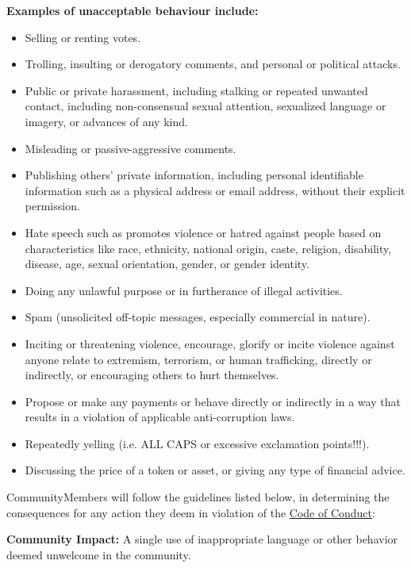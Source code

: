\textbf{Examples of unacceptable behaviour include:}
\begin{itemize}
	\item Selling or renting votes.
	\item Trolling, insulting or derogatory comments, and personal or political attacks.
	\item Public or private harassment, including stalking or repeated unwanted contact, including non-consensual sexual attention, sexualized language or imagery, or advances of any kind.
	\item Misleading or passive-aggressive comments.
	\item Publishing others' private information, including personal identifiable information such as a physical address or email address, without their explicit permission.
	\item Hate speech such as promotes violence or hatred against people based on characteristics like race, ethnicity, national origin, caste, religion, disability, disease, age, sexual orientation, gender, or gender identity.
	\item Doing any unlawful purpose or in furtherance of illegal activities.
	\item Spam (unsolicited off-topic messages, especially commercial in nature).
	\item Inciting or threatening violence, encourage, glorify or incite violence against anyone relate to extremism, terrorism, or human trafficking, directly or indirectly, or encouraging others to hurt themselves.
	\item Propose or make any payments or behave directly or indirectly in a way that results in a violation of applicable anti-corruption laws.
	\item Repeatedly yelling (i.e. ALL CAPS or excessive exclamation points!!!).
	\item Discussing the price of a token or asset, or giving any type of financial advice.
\end{itemize}


\label{sec:ViolationsAndConsequences}
	
\glspl{CommunityMember} will follow the guidelines listed below, in determining the consequences for any action they deem in violation of the \hyperref[sec:CodeOfConduct]{Code of Conduct}:


	\textbf{Community Impact:} A single use of inappropriate language or other behavior deemed unwelcome in the community.
	
